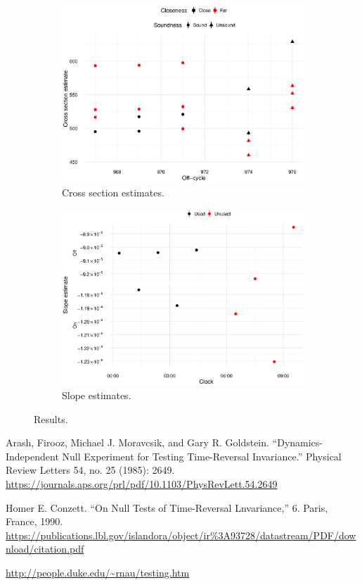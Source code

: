\documentclass[reprint]{revtex4-1}
\newcommand{\scl}{.4}
\begin{document}
\begin{figure}
\begin{subfigure}{.5\textwidth}
\includegraphics[scale=\scl]{img/Cross-Section_all.eps}
\caption{Cross section estimates.\label{fig:CS-all}}
\end{subfigure}
\begin{subfigure}{.5\textwidth}
\includegraphics[scale=\scl]{img/Slopes-2012_big.eps}
\caption{Slope estimates.\label{fig:Slopes}}
\end{subfigure}
\caption{Results.}
\end{figure}


\begin{thebibliography}{9}
Arash, Firooz, Michael J. Moravcsik, and Gary R. Goldstein. “Dynamics-Independent Null Experiment for Testing Time-Reversal Invariance.” Physical Review Letters 54, no. 25 (1985): 2649.
\url{https://journals.aps.org/prl/pdf/10.1103/PhysRevLett.54.2649}

Homer E. Conzett. “On Null Tests of Time-Reversal Lnvariance,” 6. Paris, France, 1990. \url{https://publications.lbl.gov/islandora/object/ir%3A93728/datastream/PDF/download/citation.pdf}

 \url{http://people.duke.edu/~rnau/testing.htm}
\end{thebibliography}
\end{document}

